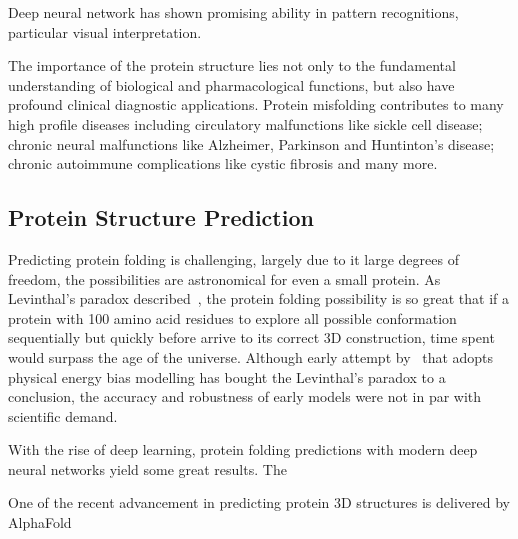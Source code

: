 Deep neural network has shown promising ability in pattern recognitions, particular visual interpretation.
\par 
The importance of the protein structure lies not only to the fundamental understanding of biological and pharmacological functions, but also have profound clinical diagnostic applications. Protein misfolding contributes to many high profile diseases including circulatory malfunctions like sickle cell disease; chronic neural malfunctions like Alzheimer, Parkinson and Huntinton's disease; chronic autoimmune complications like cystic fibrosis and many more.~\cite{Hammarstrom_2003,Chiti_2006,Selkoe_2003}  
\par 

\subsection{Protein Structure Prediction}
Predicting protein folding is challenging, largely due to it large degrees of freedom, the possibilities are astronomical for even a small protein. As Levinthal's paradox described~\cite{LEV69}, the protein folding possibility is so great that if a protein with 100 amino acid residues to explore all possible conformation sequentially but quickly before arrive to its correct 3D construction, time spent would surpass the age of the universe. Although early attempt by~\citet{Zwanzig_1992} that adopts physical energy bias modelling has bought the Levinthal's paradox to a conclusion, the accuracy and robustness of early models were not in par with scientific demand.  
\par 
With the rise of deep learning, protein folding predictions with modern deep neural networks yield some great results. The 

One of the recent advancement in predicting protein 3D structures is delivered by AlphaFold